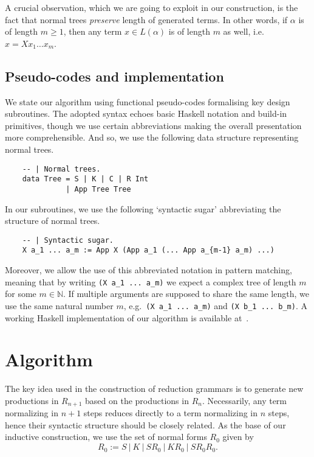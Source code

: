 \documentclass[11pt,a4paper]{amsart}
\theoremstyle{definition}
\begin{document}
A crucial observation, which we are going to exploit in our construction, is the fact that normal trees \emph{preserve} length of generated terms. In other words, if $\alpha$ is of length $m \geq 1$, then any term $x \in L(\alpha)$ is of length $m$ as well, i.e.~$x = X x_1 \ldots x_m$.

\subsection{Pseudo-codes and implementation}\label{sec-pseudocodes}

We state our algorithm using functional pseudo-codes formalising key design subroutines. The adopted syntax echoes basic Haskell notation and build-in primitives, though we use certain abbreviations making the overall presentation more comprehensible. And so, we use the following data structure representing normal trees.

\begin{lstlisting}
    -- | Normal trees.
    data Tree = S | K | C | R Int
              | App Tree Tree
\end{lstlisting}
 
In our subroutines, we use the following `syntactic sugar' abbreviating the structure of normal trees.

\begin{lstlisting}
    -- | Syntactic sugar.
    X a_1 ... a_m := App X (App a_1 (... App a_{m-1} a_m) ...)
\end{lstlisting}

Moreover, we allow the use of this abbreviated notation in pattern matching, meaning that by writing \verb|(X a_1 ... a_m)| we expect a complex tree of length $m$ for some $m \in \mathbb{N}$. If multiple arguments are supposed to share the same length, we use the same natural number $m$, e.g.~\verb|(X a_1 ... a_m)| and \verb|(X b_1 ... b_m)|.
A working Haskell implementation of our algorithm is available at~\cite{mb-haskell-implementation}.

\section{Algorithm}\label{sec:algorithm}

The key idea used in the construction of reduction grammars is to generate new productions in $R_{n+1}$ based on the productions in $R_n$. Necessarily, any term normalizing in $n+1$ steps reduces directly to a term normalizing
in $n$ steps, hence their syntactic structure should be closely related. As the base of our inductive construction, we use the set of normal forms $R_0$ given by
 \begin{equation*}
 R_0 := S~|~K~|~S R_0~|~K R_0~|~S R_0 R_0.
 \end{equation*}
 
\end{document}
